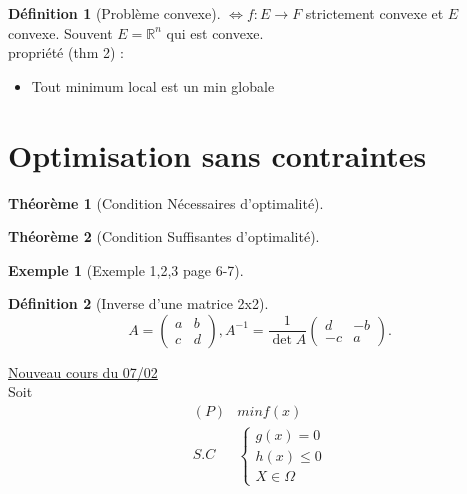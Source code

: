 \documentclass{article}
\theoremstyle{plain}%
\newtheorem{thm}{Théorème}[section]
\theoremstyle{definition}
\newtheorem{defn}{Définition}[section]
\newtheorem{exmp}{Exemple}[section]
\begin{document}
\begin{defn}[Problème convexe]
    $ \Leftrightarrow f: E \to F $ strictement convexe et $ E $ convexe. Souvent $ E=\mathbb{R}^n $ qui est convexe. \\
    propriété (thm 2) : \begin{itemize}
        \item Tout minimum local est un min globale 
    \end{itemize}
\end{defn}


\section{Optimisation sans contraintes}
\begin{thm}[Condition Nécessaires d'optimalité]
    
\end{thm}

\begin{thm}[Condition Suffisantes d'optimalité]
    
\end{thm}

\begin{exmp}[Exemple 1,2,3 page 6-7]
    
\end{exmp}

\begin{defn}[Inverse d'une matrice 2x2]
    \[
        A = \begin{pmatrix}
            a & b \\
            c & d
        \end{pmatrix}, A^{-1} = \frac{1}{\det A} \begin{pmatrix}
            d & -b \\
            -c & a
        \end{pmatrix}
    .\]
\end{defn}

\underline{Nouveau cours du 07/02} \\

Soit 
\begin{align*}
    (P) &min f(x) \\
    S.C & \begin{cases}
        g(x) = 0   \\
        h(x)\leq 0 \\
        X \in \Omega 
    \end{cases}
\end{align*}
\end{document}
